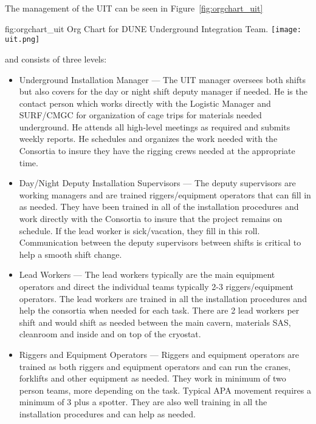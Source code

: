 The management of the UIT can be seen in Figure~\ref{fig:orgchart_uit}
\begin{dunefigure}{fig:orgchart_uit}
  {Org Chart for DUNE Underground Integration Team.}
  \texttt{[image: uit.png]}
\end{dunefigure}
and consists of three levels:
\begin{itemize}
  \item Underground Installation Manager --- The UIT manager oversees
    both shifts but also covers for the day or night shift deputy
    manager if needed.  He is the contact person which works directly
    with the Logistic Manager and SURF/CMGC for organization of cage
    trips for materials needed underground.  He attends all high-level
    meetings as required and submits weekly reports.  He schedules and
    organizes the work needed with the Consortia to insure they have
    the rigging crews needed at the appropriate time.
  \item Day/Night Deputy Installation Supervisors --- The deputy
      supervisors are working managers and are trained
      riggers/equipment operators that can fill in as needed.  They
      have been trained in all of the installation procedures and work
      directly with the Consortia to insure that the project remains
      on schedule.  If the lead worker is sick/vacation, they fill in
      this roll. Communication between the deputy supervisors between
      shifts is critical to help a smooth shift change.
  \item Lead Workers --- The lead workers typically are the main
    equipment operators and direct the individual teams typically 2-3
    riggers/equipment operators.  The lead workers are trained in all
    the installation procedures and help the consortia when needed for
    each task.  There are 2 lead workers per shift and would shift as
    needed between the main cavern, materials SAS, cleanroom and
    inside and on top of the cryostat.
  \item Riggers and Equipment Operators --- Riggers and equipment
    operators are trained as both riggers and equipment operators and
    can run the cranes, forklifts and other equipment as needed.  They
    work in minimum of two person teams, more depending on the
    task. Typical APA movement requires a minimum of 3 plus a
    spotter. They are also well training in all the installation
    procedures and can help as needed.
\end{itemize}


